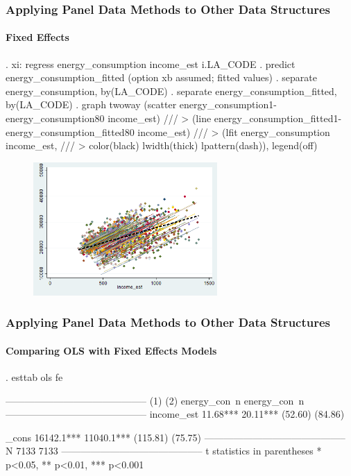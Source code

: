 \documentclass{beamer}
\begin{document}
\begin{frame}[fragile]
    \frametitle{Applying Panel Data Methods to Other Data Structures}
    \framesubtitle{Fixed Effects}
    \tiny
    \begin{CVerbatim}[fontsize=\tiny]
. xi: regress energy_consumption income_est i.LA_CODE
. predict energy_consumption_fitted
(option xb assumed; fitted values)
. separate energy_consumption, by(LA_CODE)
. separate energy_consumption_fitted, by(LA_CODE)
. graph twoway (scatter energy_consumption1-energy_consumption80 income_est) ///
>         (line energy_consumption_fitted1-energy_consumption_fitted80 income_est) ///
>         (lfit energy_consumption income_est, ///
>         color(black) lwidth(thick) lpattern(dash)), legend(off) 
    \end{CVerbatim}
    
    \begin{figure}
    \includegraphics[width=7cm]{../stata_code/fe.png}
    \centering
    \end{figure}
\end{frame}
  
\begin{frame}[fragile]
    \frametitle{Applying Panel Data Methods to Other Data Structures}
    \framesubtitle{Comparing OLS with Fixed Effects Models}
    \tiny
    \begin{CVerbatim}[fontsize=\tiny]
. esttab ols fe

--------------------------------------------
                      (1)             (2)   
             energy_con~n    energy_con~n   
--------------------------------------------
income_est          11.68***        20.11***
                  (52.60)         (84.86)   

_cons             16142.1***      11040.1***
                 (115.81)         (75.75)   
--------------------------------------------
N                    7133            7133   
--------------------------------------------
t statistics in parentheses
* p<0.05, ** p<0.01, *** p<0.001
    \end{CVerbatim}

\end{frame}
\end{document}
